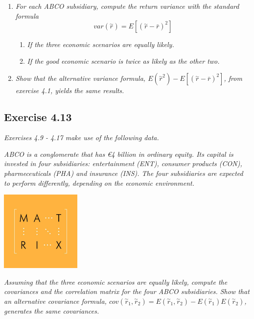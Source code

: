 \documentclass[]{book}
\newcommand{\euro}{€}
\providecommand{\tightlist}{%
  \setlength{\itemsep}{0pt}\setlength{\parskip}{0pt}}
\theoremstyle{definition}
\theoremstyle{definition}
\theoremstyle{remark}
\begin{document}
\begin{enumerate}
\def\labelenumi{\alph{enumi}.}
\tightlist
\item
  \emph{For each ABCO subsidiary, compute the return variance with the
  standard formula} \citep[p.118]{book}
  \[var\left(\overset{\sim}{r}\right)=E\left[\left(\overset{\sim}{r}-\bar{r}\right)^2\right]\]

  \begin{enumerate}
  \def\labelenumii{\roman{enumii}.}
  \item
    \emph{If the three economic scenarios are equally likely.}
    \citep[p.118]{book}
  \item
    \emph{If the good economic scenario is twice as likely as the other
    two.} \citep[p.118]{book}
  \end{enumerate}
\item
  \emph{Show that the alternative variance formula,
  \(E\left(\overset{\sim}{r}^2\right)-E\left[\left(\overset{\sim}{r}-\bar{r}\right)^2\right]\),
  from exercise 4.1, yields the same results.} \citep[p.118]{book}
\end{enumerate}

\subsection{Exercise 4.13}\label{exercise-4.13}

\emph{Exercises 4.9 - 4.17 make use of the following data.}
\citep[p.117]{book}

\emph{ABCO is a conglomerate that has \euro{}4 billion in ordinary
equity. Its capital is invested in four subsidiaries: entertainment
(ENT), consumer products (CON), pharmeceuticals (PHA) and insurance
(INS). The four subsidiaries are expected to perform differently,
depending on the economic environment.} \citep[p.117]{book}

\begin{center}\includegraphics[width=150px]{figures/matrix} \end{center}

\emph{Assuming that the three economic scenarios are equally likely,
compute the covariances and the correlation matrix for the four ABCO
subsidiaries. Show that an alternative covariance formula,
\(cov\left(\overset{\sim}{r}_1,\overset{\sim}{r}_2\right) = E\left(\overset{\sim}{r}_1,\overset{\sim}{r}_2\right)-E\left(\overset{\sim}{r}_1\right)E\left(\overset{\sim}{r}_2\right)\),
generates the same covariances.} \citep[p.118]{book}
\end{document}
